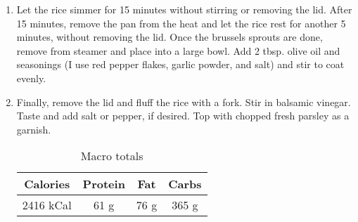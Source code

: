 \documentclass{report}
\begin{document}
\begin{multicols}{2}
\begin{enumerate}
\item Let the rice simmer for 15 minutes without stirring or removing the lid. After 15 minutes, remove the pan from the heat and let the rice rest for another 5 minutes, without removing the lid. Once the brussels sprouts are done, remove from steamer and place into a large bowl. Add 2 tbsp. olive oil and seasonings (I use red pepper flakes, garlic powder, and salt) and stir to coat evenly. 
\item Finally, remove the lid and fluff the rice with a fork. Stir in balsamic vinegar. Taste and add salt or pepper, if desired. Top with chopped fresh parsley as a garnish.

\begin{table}[H]
  \begin{center}
    \caption{Macro totals}
    \label{tab:table1}
    \begin{tabular}{c|c|c|c} %
      \textbf{Calories} & \textbf{Protein} & \textbf{Fat} & \textbf{Carbs}\\
      \hline
      2416 kCal & 61 g & 76 g & 365 g\\
    \end{tabular}
  \end{center}
\end{table}
 
\end{enumerate}
\end{multicols}




\end{document}
